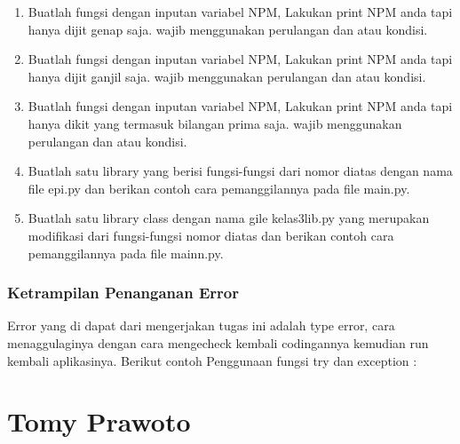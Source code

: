 \begin{enumerate}
    \item Buatlah fungsi dengan inputan variabel NPM, Lakukan print NPM anda tapi hanya dijit genap saja. wajib menggunakan perulangan dan atau kondisi.
        

    \item Buatlah fungsi dengan inputan variabel NPM, Lakukan print NPM anda tapi hanya dijit ganjil saja. wajib menggunakan perulangan dan atau kondisi.
        

    \item Buatlah fungsi dengan inputan variabel NPM, Lakukan print NPM anda tapi hanya dikit yang termasuk bilangan prima saja. wajib menggunakan perulangan dan atau kondisi.
        

    \item Buatlah satu library yang berisi fungsi-fungsi dari nomor diatas dengan nama file epi.py dan berikan contoh cara pemanggilannya pada file main.py.
        

    \item Buatlah satu library class dengan nama gile kelas3lib.py yang merupakan modifikasi dari fungsi-fungsi nomor diatas dan berikan contoh cara pemanggilannya pada file mainn.py.
        

\end{enumerate}

\subsubsection{Ketrampilan Penanganan Error}
Error yang di dapat dari mengerjakan tugas ini adalah type error, cara menaggulaginya dengan cara mengecheck kembali codingannya
kemudian run kembali aplikasinya. Berikut contoh Penggunaan fungsi try dan exception :



\section{Tomy Prawoto}
